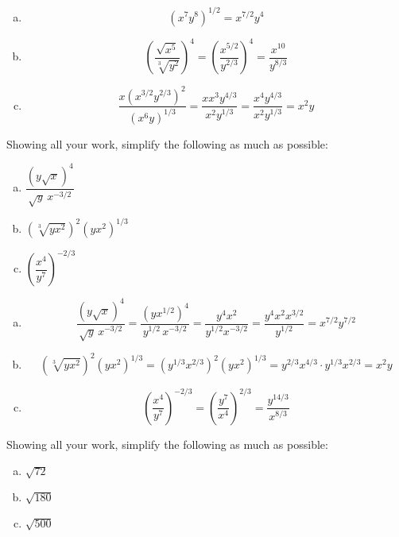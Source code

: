 \documentclass[11pt,letterpaper]{article}
\begin{document}
\sol
\begin{enumerate}[(a)]
\item 
	\[
	(x^7 y^8)^{1/2}= x^{7/2} y^4
	\] \pspace

\item 
	\[
	\left( \dfrac{\sqrt{x^5}}{\sqrt[3]{y^2}} \right)^4= \left( \dfrac{x^{5/2}}{y^{2/3}} \right)^4= \dfrac{x^{10}}{y^{8/3}}
	\] \pspace

\item 
	\[
	\dfrac{x(x^{3/2}y^{2/3})^2}{(x^6 y)^{1/3}}= \dfrac{x x^3 y^{4/3}}{x^2 y^{1/3}}= \dfrac{x^4 y^{4/3}}{x^2 y^{1/3}}= x^2 y
	\]
\end{enumerate}



\newpage



 Showing all your work, simplify the following as much as possible:
        \begin{enumerate}[(a)]
        \item $\dfrac{(y \sqrt{x})^4}{\sqrt{y}\, x^{-3/2}}$
        \item $(\sqrt[3]{y x^2})^2 (yx^2)^{1/3}$
        \item $\left( \dfrac{x^4}{y^7} \right)^{-2/3}$
        \end{enumerate} \pspace

\sol
\begin{enumerate}[(a)]
\item 
	\[
	\dfrac{(y \sqrt{x})^4}{\sqrt{y}\, x^{-3/2}}= \dfrac{(y x^{1/2})^4}{y^{1/2}\, x^{-3/2}}= \dfrac{y^4 x^2}{y^{1/2} x^{-3/2}}= \dfrac{y^4 x^2 x^{3/2}}{y^{1/2}}= x^{7/2} y^{7/2}
	\] \pspace

\item 
	\[
	(\sqrt[3]{y x^2})^2 (yx^2)^{1/3}= (y^{1/3} x^{2/3})^2 (yx^2)^{1/3}= y^{2/3} x^{4/3} \cdot y^{1/3} x^{2/3}= x^2y
	\] \pspace

\item 
	\[
	\left( \dfrac{x^4}{y^7} \right)^{-2/3}= \left( \dfrac{y^7}{x^4} \right)^{2/3}= \dfrac{y^{14/3}}{x^{8/3}}
	\]
\end{enumerate}



\newpage



 Showing all your work, simplify the following as much as possible:
        \begin{enumerate}[(a)]
        \item $\sqrt{72}$
        \item $\sqrt{180}$
        \item $\sqrt{500}$
        \end{enumerate} \pspace
\end{document}
